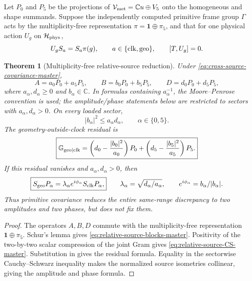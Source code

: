 \documentclass[11pt]{article}
\newtheorem{theorem}{Theorem}[section]
\theoremstyle{definition}
\theoremstyle{remark}
\newcommand{\C}{\mathbb C}
\begin{document}
Let $P_0$ and $P_5$ be the projections of
$\mathcal V_{\rm met}=\C u\oplus V_5$ onto the homogeneous and shape
summands.  Suppose the independently computed primitive frame group $\Gamma$
acts by the multiplicity-free representation
$\pi=\mathbf1\oplus\pi_5$, and that for one physical action $U_g$ on
$\mathcal H_{\rm phys}$,
\begin{equation}
  U_gS_a=S_a\pi(g),
  \qquad a\in\{{\rm clk},{\rm geo}\},
  \qquad [T,U_g]=0.
  \label{eq:cross-source-covariance-master}
\end{equation}

\begin{theorem}[Multiplicity-free relative-source reduction]
\label{thm:relative-source-sector-master}
Under \eqref{eq:cross-source-covariance-master},
\begin{equation}
  \boxed{
  A=a_0P_0+a_5P_5,
  \qquad
  B=b_0P_0+b_5P_5,
  \qquad
  D=d_0P_0+d_5P_5,}
  \label{eq:relative-source-blocks-master}
\end{equation}
where $a_\alpha,d_\alpha\ge0$ and $b_\alpha\in\C$.  In formulas containing
$a_\alpha^{-1}$, the Moore--Penrose convention is used; the amplitude/phase
statements below are restricted to sectors with $a_\alpha,d_\alpha>0$.  On
every loaded sector,
\begin{equation}
  \boxed{|b_\alpha|^2\le a_\alpha d_\alpha,
  \qquad \alpha\in\{0,5\}.}
  \label{eq:relative-source-CS-master}
\end{equation}
The geometry-outside-clock residual is
\begin{equation}
  \boxed{
  \mathbb G_{{\rm geo}\mid{\rm clk}}
  =\left(d_0-\frac{|b_0|^2}{a_0}\right)P_0
   +\left(d_5-\frac{|b_5|^2}{a_5}\right)P_5.}
  \label{eq:relative-source-residual-master}
\end{equation}
If this residual vanishes and $a_\alpha,d_\alpha>0$, then
\begin{equation}
  \boxed{
  S_{\rm geo}P_\alpha
  =\lambda_\alpha e^{i\phi_\alpha}S_{\rm clk}P_\alpha,}
  \qquad
  \lambda_\alpha=\sqrt{d_\alpha/a_\alpha},
  \qquad
  e^{i\phi_\alpha}=b_\alpha/|b_\alpha|.
  \label{eq:relative-source-phase-master}
\end{equation}
Thus primitive covariance reduces the entire same-range discrepancy to two
amplitudes and two phases, but does not fix them.
\end{theorem}

\begin{proof}
The operators $A,B,D$ commute with the multiplicity-free representation
$\mathbf1\oplus\pi_5$.  Schur's lemma gives
\eqref{eq:relative-source-blocks-master}.  Positivity of the two-by-two scalar
compression of the joint Gram gives
\eqref{eq:relative-source-CS-master}.  Substitution in
 gives the residual formula.  Equality in the
sectorwise Cauchy--Schwarz inequality makes the normalized source isometries
collinear, giving the amplitude and phase formula.
\end{proof}
\end{document}
